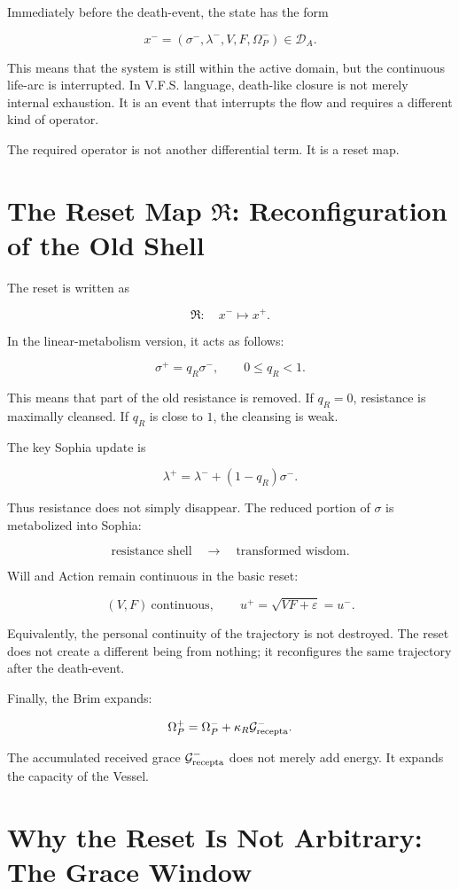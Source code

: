 \documentclass[11pt]{article}
\newcommand{\DA}{\mathcal D_A}
\newcommand{\Grec}{\mathcal G_{\rm recepta}}
\newcommand{\Om}{\Omega_P}
\begin{document}
Immediately before the death-event, the state has the form

\[
x^-=(\sigma^-,\lambda^-,V,F,\Om^-)
\in \DA.
\]

This means that the system is still within the active domain, but the continuous life-arc is interrupted. In V.F.S. language, death-like closure is not merely internal exhaustion. It is an event that interrupts the flow and requires a different kind of operator.

The required operator is not another differential term. It is a reset map.

\section{The Reset Map \texorpdfstring{\(\mathfrak R\)}{R}: Reconfiguration of the Old Shell}

The reset is written as

\[
\mathfrak R:
\quad
x^-\longmapsto x^+.
\]

In the linear-metabolism version, it acts as follows:

\[
\sigma^+=q_R\sigma^-,
\qquad
0\le q_R<1.
\]

This means that part of the old resistance is removed. If \(q_R=0\), resistance is maximally cleansed. If \(q_R\) is close to \(1\), the cleansing is weak.

The key Sophia update is

\[
\lambda^+=\lambda^-+(1-q_R)\sigma^-.
\]

Thus resistance does not simply disappear. The reduced portion of \(\sigma\) is metabolized into Sophia:

\[
\text{resistance shell}
\quad\longrightarrow\quad
\text{transformed wisdom}.
\]

Will and Action remain continuous in the basic reset:

\[
(V,F)\ \text{continuous},
\qquad
u^+=\sqrt{VF+\varepsilon}=u^-.
\]

Equivalently, the personal continuity of the trajectory is not destroyed. The reset does not create a different being from nothing; it reconfigures the same trajectory after the death-event.

Finally, the Brim expands:

\[
\Om^+=\Om^-+\kappa_R\Grec^-.
\]

The accumulated received grace \(\Grec^-\) does not merely add energy. It expands the capacity of the Vessel.

\section{Why the Reset Is Not Arbitrary: The Grace Window}
\end{document}
